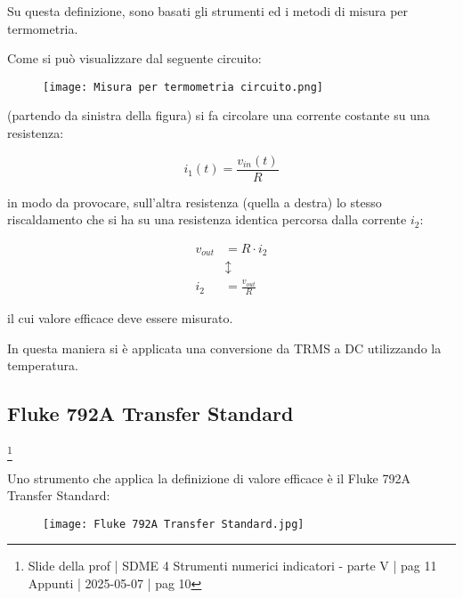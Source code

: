 Su questa definizione, sono basati gli strumenti ed i metodi di misura per termometria. \newline 

Come si può visualizzare dal seguente circuito: 

\begin{figure}[h]
    \centering
    \texttt{[image: Misura per termometria circuito.png]}
\end{figure}

(partendo da sinistra della figura) si fa circolare una corrente costante su una resistenza: 

{
    \Large 
    \begin{equation}
        i_1 (t) = \frac{v_{in}(t)}{R}
    \end{equation}
}

in modo da provocare, sull'altra resistenza (quella a destra) lo stesso riscaldamento che si ha su una resistenza identica 
percorsa dalla corrente $i_2$: 

{
    \Large 
    \begin{equation}
        \begin{split}
        v_{out} &= R \cdot i_2
        \\ 
        &\updownarrow 
        \\
        i_2 &= \frac{v_{out}}{R}
        \end{split}        
    \end{equation}
}

il cui valore efficace deve essere misurato. \newline 

In questa maniera si è applicata una conversione da TRMS a DC utilizzando la temperatura. \newline 

\newpage 

\subsection{Fluke 792A Transfer Standard}
\footnote{Slide della prof | SDME 4 Strumenti numerici indicatori - parte V | pag 11\\  
Appunti | 2025-05-07 | pag 10}

Uno strumento che applica la definizione di valore efficace è il Fluke 792A Transfer Standard: 

\begin{figure}[h]
    \centering
    \texttt{[image: Fluke 792A Transfer Standard.jpg]}
\end{figure}

